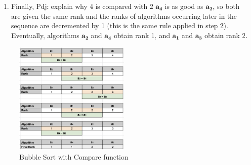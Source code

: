 \documentclass[conference]{IEEEtran}
\newcommand{\p}[1]{{\color{blue} Pdj: #1}}
\begin{document}
\begin{enumerate}
	\item
          Finally, \p{explain why 4 is compared with 2}
          $\mathbf{a_4}$ is as good as $\mathbf{a_2}$, so both are given the same rank and the ranks of algorithms
          occurring later in the sequence are decremented by 1 (this is the same rule applied in step 2). Eventually,
          algorithms $\mathbf{a_2}$ and $\mathbf{a_4}$ obtain rank 1, and $\mathbf{a_1}$ and $\mathbf{a_3}$ obtain rank 2.
\end{enumerate}

\begin{figure}
	\includegraphics[width=0.5\textwidth]{fig/ranking}
	\caption{Bubble Sort with Compare function}
	\label{fig:sort}
\end{figure}
\end{document}
